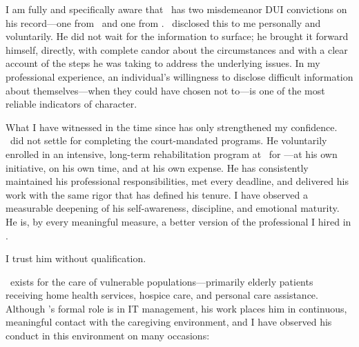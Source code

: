 I am fully and specifically aware that \ApplicantName\ has two misdemeanor DUI convictions on his record---one from \IncidentOneDate\ and one from \IncidentTwoDate. \ApplicantName\ disclosed this to me personally and voluntarily. He did not wait for the information to surface; he brought it forward himself, directly, with complete candor about the circumstances and with a clear account of the steps he was taking to address the underlying issues. In my professional experience, an individual's willingness to disclose difficult information about themselves---when they could have chosen not to---is one of the most reliable indicators of character.

What I have witnessed in the time since has only strengthened my confidence. \ApplicantName\ did not settle for completing the court-mandated programs. He voluntarily enrolled in an intensive, long-term rehabilitation program at \RehabProgram\ for \RehabDuration---at his own initiative, on his own time, and at his own expense. He has consistently maintained his professional responsibilities, met every deadline, and delivered his work with the same rigor that has defined his tenure. I have observed a measurable deepening of his self-awareness, discipline, and emotional maturity. He is, by every meaningful measure, a better version of the professional I hired in \EmployerSince.

I trust him without qualification.


\EmployerName\ exists for the care of vulnerable populations---primarily elderly patients receiving home health services, hospice care, and personal care assistance. Although \ApplicantName's formal role is in IT management, his work places him in continuous, meaningful contact with the caregiving environment, and I have observed his conduct in this environment on many occasions:

